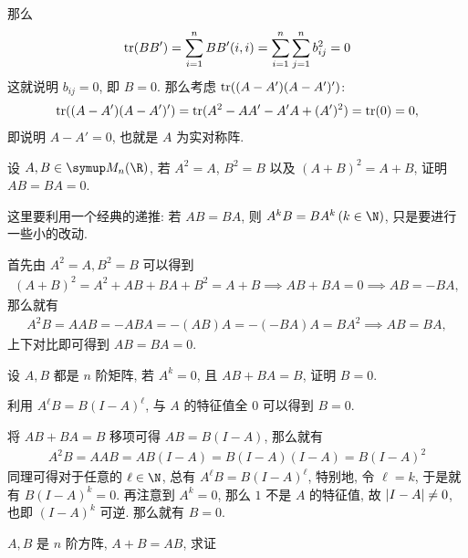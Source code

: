 \begin{exercise}[series=exer]
\begin{answer}
      那么
      \begin{align*}
          \tr(BB') = \sum_{i = 1}^{n} BB'(i, i) = \sum_{i = 1}^{n}\sum_{j = 1}^{n} b_{ij}^{2} = 0
      \end{align*}
      这就说明 $ b_{ij} = 0 $, 即 $ B = 0 $. 那么考虑 $ \tr((A - A')(A - A')') $:
      \begin{align*}
          \tr((A - A')(A - A')') = \tr(A^{2} - AA' - A'A + (A')^{2}) = \tr(0) = 0,
      \end{align*}
      即说明 $ A - A' = 0 $, 也就是 $ A $ 为实对称阵.
  \end{answer}
  \item 设 $ A, B \in \MM $, 若 $ A^{2} = A $, $ B^{2} = B $ 以及 $ (A + B)^{2} = A + B $, 证明 $ AB = BA = 0 $.
  \begin{hint}
      这里要利用一个经典的递推: 若 $ AB = BA $, 则 $ A^{k}B = BA^{k}\,(k \in \N) $, 只是要进行一些小的改动.
  \end{hint}
  \begin{answer}
      首先由 $ A^{2} = A, B^{2} = B $ 可以得到
      \begin{align*}
          (A + B)^{2} = A^{2} + AB + BA + B^{2} = A + B \implies AB + BA = 0 \implies AB = -BA,
      \end{align*}
      那么就有
      \begin{align*}
          A^{2}B = AAB = -ABA = -(AB)A = -(-BA)A = BA^{2} \implies AB = BA,
      \end{align*}
      上下对比即可得到 $ AB = BA = 0 $.
  \end{answer}
  \item 设 $ A, B $ 都是 $ n $ 阶矩阵, 若 $ A^{k} = 0 $, 且 $ AB + BA = B $, 证明 $ B = 0 $.
  \begin{hint}
      利用 $ A^{\ell}B = B(I - A)^{\ell} $, 与 $ A $ 的特征值全 $ 0 $ 可以得到 $ B = 0 $.
  \end{hint}
  \begin{answer}
      将 $ AB + BA = B $ 移项可得 $ AB = B(I - A) $, 那么就有
      \begin{align*}
          A^{2}B = AAB = AB(I - A) = B(I - A)(I - A) = B(I - A)^{2}
      \end{align*}
      同理可得对于任意的 $ \ell \in \N $, 总有 $ A^{\ell}B = B(I - A)^{\ell} $, 特别地, 令 $ \ell = k $, 于是就有 $ B(I - A)^{k} = 0 $. 再注意到 $ A^{k} = 0 $, 那么 $ 1 $ 不是 $ A $ 的特征值, 故 $ \abs{I - A} \ne 0 $, 也即 $ (I - A)^{k} $ 可逆. 那么就有 $ B = 0 $.
  \end{answer}
  \item $ A, B $ 是 $ n $ 阶方阵, $ A + B = AB $, 求证

\end{exercise}
